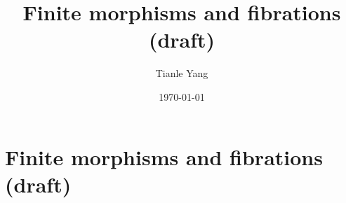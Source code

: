 \documentclass{noteformyself}
\title{Finite morphisms and fibrations (draft)}
\author{Tianle Yang}
\date{\today}
\begin{document}
    \maketitle

    \section{Finite morphisms and fibrations (draft)}


    \printbibliography[heading=bibintoc, title={References}] %
\end{document}
